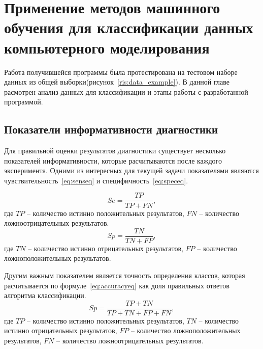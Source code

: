 \newpage
\section{\Large Применение методов машинного обучения для классификации данных компьютерного моделирования}
Работа получившейся программы была протестирована на тестовом наборе данных из общей выборки(рисунок~\ref{ris:data_example}). В данной главе расмотрен анализ данных для классификации и этапы работы с разработанной программой.

\subsection{Показатели информативности диагностики}
Для правильной оценки результатов диагностики существует несколько показателей информативности, которые расчитываются после каждого эксперимента. Одними из интересных для текущей задачи показателями являются чувствительность~\eqref{eq:senseq} и специфичность~\eqref{eq:speceq}.
\par
\begin{equation}\label{eq:senseq}
Se = \frac{TP}{TP + FN},
\end{equation}
где $TP$ -- количество истинно положительных результатов, $FN$ -- количество ложноотрицательных результатов.
\begin{equation}\label{eq:speceq}
Sp = \frac{TN}{TN + FP},
\end{equation}
где $TN$ -- количество истинно отрицательных результатов, $FP$ -- количество ложноположительных результатов.
\par
Другим важным показателем является точность определения классов, которая расчитывается по формуле~\eqref{eq:accuracyeq} как доля правильных ответов алгоритма классификации.
\begin{equation}\label{eq:accuracyeq}
Sp = \frac{TP + TN}{TP + TN + FP + FN},
\end{equation}
где $TP$ -- количество истинно положительных результатов, $TN$ -- количество истинно отрицательных результатов, $FP$ -- количество ложноположительных результатов, $FN$ -- количество ложноотрицательных результатов.

